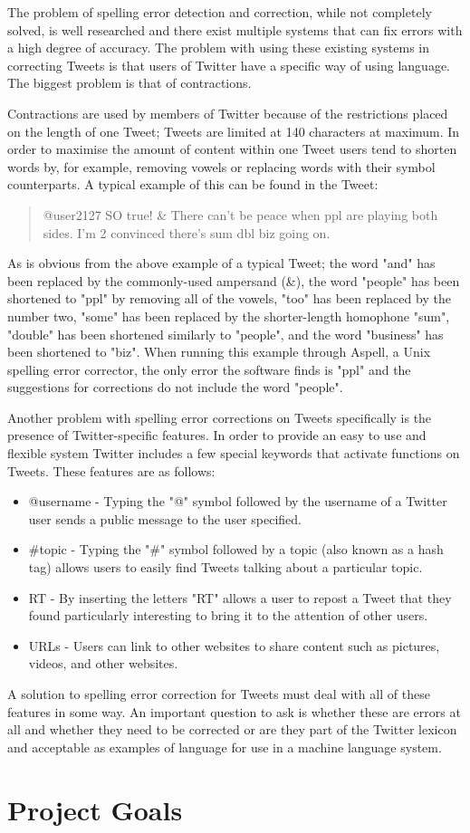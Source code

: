 The problem of spelling error detection and correction, while not completely solved, is well researched and there exist multiple systems that can fix errors with a high degree of accuracy. The problem with using these existing systems in correcting Tweets is that users of Twitter have a specific way of using language. The biggest problem is that of contractions.

Contractions are used by members of Twitter because of the restrictions placed on the length of one Tweet; Tweets are limited at 140 characters at maximum. In order to maximise the amount of content within one Tweet users tend to shorten words by, for example, removing vowels or replacing words with their symbol counterparts. A typical example of this can be found in the Tweet:
\begin{quote}
@user2127 SO true! \& There can't be peace when ppl are playing both sides. I'm 2 convinced there's sum dbl biz going on.
\end{quote}
As is obvious from the above example of a typical Tweet; the word "and" has been replaced by the commonly-used ampersand (\&), the word "people" has been shortened to "ppl" by removing all of the vowels, "too" has been replaced by the number two, "some" has been replaced by the shorter-length homophone "sum", "double" has been shortened similarly to "people", and the word "business" has been shortened to "biz". When running this example through Aspell, a Unix spelling error corrector, the only error the software finds is "ppl" and the suggestions for corrections do not include the word "people".

Another problem with spelling error corrections on Tweets specifically is the presence of Twitter-specific features. In order to provide an easy to use and flexible system Twitter includes a few special keywords that activate functions on Tweets. These features are as follows:
\begin{itemize}
\item
@username - Typing the "@" symbol followed by the username of a Twitter user sends a public message to the user specified.
\item
#topic - Typing the "#" symbol followed by a topic (also known as a hash tag) allows users to easily find Tweets talking about a particular topic.
\item
RT - By inserting the letters "RT" allows a user to repost a Tweet that they found particularly interesting to bring it to the attention of other users.
\item
URLs - Users can link to other websites to share content such as pictures, videos, and other websites.
\end{itemize}
A solution to spelling error correction for Tweets must deal with all of these features in some way. An important question to ask is whether these are errors at all and whether they need to be corrected or are they part of the Twitter lexicon and acceptable as examples of language for use in a machine language system.

\section{Project Goals}